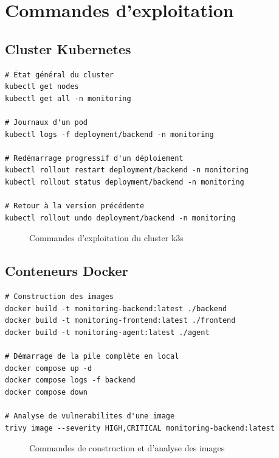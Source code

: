 \chapter{Commandes d'exploitation}

\section{Cluster Kubernetes}

\begin{lrbox}{\annexbox}
\begin{minipage}{0.88\textwidth}
\begin{verbatim}
# État général du cluster
kubectl get nodes
kubectl get all -n monitoring

# Journaux d'un pod
kubectl logs -f deployment/backend -n monitoring

# Redémarrage progressif d'un déploiement
kubectl rollout restart deployment/backend -n monitoring
kubectl rollout status deployment/backend -n monitoring

# Retour à la version précédente
kubectl rollout undo deployment/backend -n monitoring
\end{verbatim}
\end{minipage}
\end{lrbox}
\begin{figure}[H]
\centering
\fbox{\usebox{\annexbox}}
\caption{Commandes d'exploitation du cluster k3s}
\label{fig:annexe-kubectl}
\end{figure}

\section{Conteneurs Docker}

\begin{lrbox}{\annexbox}
\begin{minipage}{0.88\textwidth}
\begin{verbatim}
# Construction des images
docker build -t monitoring-backend:latest ./backend
docker build -t monitoring-frontend:latest ./frontend
docker build -t monitoring-agent:latest ./agent

# Démarrage de la pile complète en local
docker compose up -d
docker compose logs -f backend
docker compose down

# Analyse de vulnerabilites d'une image
trivy image --severity HIGH,CRITICAL monitoring-backend:latest
\end{verbatim}
\end{minipage}
\end{lrbox}
\begin{figure}[H]
\centering
\fbox{\usebox{\annexbox}}
\caption{Commandes de construction et d'analyse des images}
\label{fig:annexe-docker}
\end{figure}

